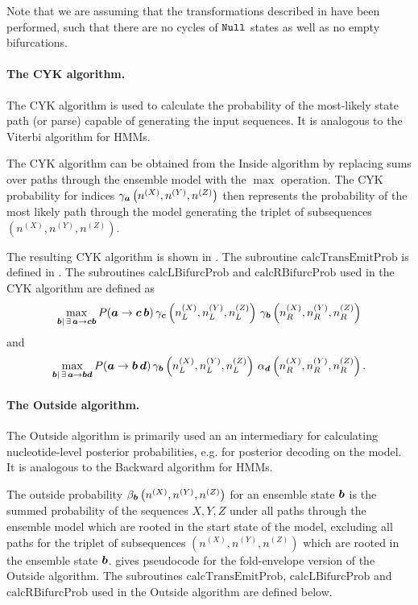 \documentclass[10pt]{article}
\begin{document}
Note that we are assuming that the transformations described in  have been performed, such that there are no cycles of $\mathtt{Null}$ states as well as no empty bifurcations.


\paragraph{The CYK algorithm.}
The CYK algorithm is used to calculate the probability of the
most-likely state path (or parse) capable of generating the input
sequences.  It is analogous to the Viterbi algorithm for HMMs.

The CYK algorithm can be obtained from the Inside algorithm by replacing sums over paths through the ensemble model
with the $\max$ operation.
The CYK probability for indices $\gamma_{\boldsymbol{a}} \left(n^{(X)}, n^{(Y)}, n^{(Z)}\right)$ then represents
the probability of the most likely path through the model generating 
the triplet of subsequences $\left( n^{(X)}, n^{(Y)}, n^{(Z)} \right)$.

The resulting CYK algorithm is shown in .
The subroutine $\mathrm{calcTransEmitProb}$ is defined in .  The subroutines $\mathrm{calcLBifurcProb}$ and $\mathrm{calcRBifurcProb}$
used in the CYK algorithm are defined as 
\[ \max_{\boldsymbol{b}|\,\exists\, \boldsymbol{a}\to\boldsymbol{c}\boldsymbol{b}} P (\boldsymbol{a}\to\boldsymbol{c}\,\boldsymbol{b}) \, \gamma_{\boldsymbol{c}}\left( n^{(X)}_L,n^{(Y)}_L,n^{(Z)}_L\right) \, \gamma_{\boldsymbol{b}}\left( n^{(X)}_R,n^{(Y)}_R,n^{(Z)}_R\right) \]
and
\[ \max_{\boldsymbol{b}|\,\exists\, \boldsymbol{a}\to\boldsymbol{b}\boldsymbol{d}} P (\boldsymbol{a}\to\boldsymbol{b}\,\boldsymbol{d}) \, \gamma_{\boldsymbol{b}}\left( n^{(X)}_L,n^{(Y)}_L,n^{(Z)}_L\right) \, \alpha_{\boldsymbol{d}}\left( n^{(X)}_R,n^{(Y)}_R,n^{(Z)}_R\right) . \]


\paragraph{The Outside algorithm.}
The Outside algorithm is primarily used an an intermediary for calculating nucleotide-level posterior probabilities, e.g. for posterior decoding on the model.
It is analogous to the Backward algorithm for HMMs.

The outside probability $\beta_{\boldsymbol{b}} \left( n^{(X)}, n^{(Y)}, n^{(Z)}\right)$ for an ensemble state $\boldsymbol{b}$
is the summed probability of the sequences $X, Y, Z$
under all paths through the ensemble model which are rooted in the start state of the model, excluding all paths for the triplet of subsequences $\left( n^{(X)}, n^{(Y)}, n^{(Z)} \right)$
which are rooted in the ensemble state $\boldsymbol{b}$.
 gives pseudocode for the fold-envelope version of the Outside algorithm.
The subroutines $\mathrm{calcTransEmitProb}$, $\mathrm{calcLBifurcProb}$ and $\mathrm{calcRBifurcProb}$
used in the Outside algorithm are defined below.
\end{document}
